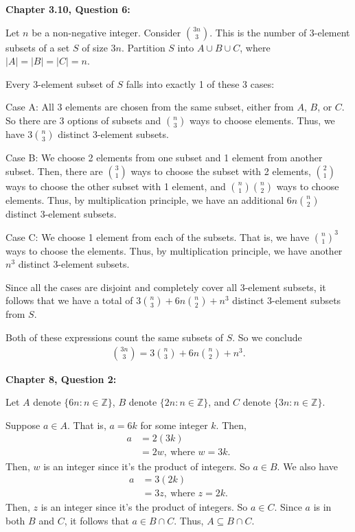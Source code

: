 \documentclass[12pt]{article}
\begin{document}
\noindent \textbf{Chapter 3.10, Question 6:}

Let $n$ be a non-negative integer.
Consider $\binom{3n}{3}$.
This is the number of 3-element subsets of a set $S$ of size $3n$.
Partition $S$ into $A \cup B \cup C$, where $|A| = |B| = |C| = n$.

Every 3-element subset of $S$ falls into exactly 1 of these 3 cases:

Case A: All 3 elements are chosen from the same subset, either from $A$, $B$, or $C$.
So there are 3 options of subsets and $\binom{n}{3}$ ways to choose elements.
Thus, we have $3\binom{n}{3}$ distinct 3-element subsets.

Case B: We choose 2 elements from one subset and 1 element from another subset.
Then, there are $\binom{3}{1}$ ways to choose the subset with 2 elements,
$\binom{2}{1}$ ways to choose the other subset with 1 element,
and $\binom{n}{1}\binom{n}{2}$ ways to choose elements.
Thus, by multiplication principle, we have an additional $6n\binom{n}{2}$ distinct 3-element subsets.

Case C: We choose 1 element from each of the subsets.
That is, we have $\binom{n}{1}^3$ ways to choose the elements.
Thus, by multiplication principle, we have another $n^3$ distinct 3-element subsets.

Since all the cases are disjoint and completely cover all 3-element subsets,
it follows that we have a total of $3\binom{n}{3} + 6n\binom{n}{2} + n^3$ distinct 3-element subsets from $S$.

Both of these expressions count the same subsets of $S$. So we conclude
\begin{align*}
    \binom{3n}{3} = 3\binom{n}{3} + 6n\binom{n}{2} + n^3.
\end{align*}

\noindent \textbf{Chapter 8, Question 2:}

Let $A$ denote $\{ 6n : n \in{\mathbb{Z}} \}$, $B$ denote $\{ 2n : n \in{\mathbb{Z}} \}$, and $C$ denote $\{ 3n : n \in{\mathbb{Z}} \}$.

Suppose $a \in A$. That is, $a = 6k$ for some integer $k$.
Then,
\begin{align*}
    a & = 2(3k)                       \\
      & = 2w,  ~\text{where $w= 3k$.}
\end{align*}
Then, $w$ is an integer since it's the product of integers.
So $a \in B$.
We also have
\begin{align*}
    a & = 3(2k)                        \\
      & = 3z, ~ \text{where $z = 2k$.}
\end{align*}
Then, $z$ is an integer  since it's the product of integers.
So $a \in C$.
Since $a$ is in both $B$ and $C$, it follows that $a \in B \cap C$.
Thus, $A \subseteq B \cap C$.
\end{document}
